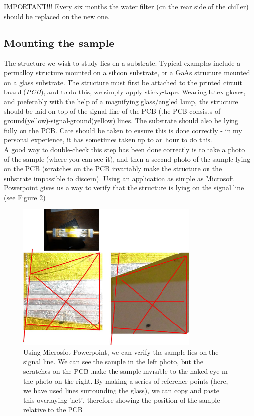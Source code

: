 \documentclass[14pt,a4paper] {article}
\begin{document}
IMPORTANT!!! Every six months the water filter (on the rear side of the chiller) should be replaced on the new one.

\subsection{Mounting the sample}

The structure we wish to study lies on a substrate. Typical examples include a permalloy structure mounted on a silicon substrate, or a GaAs structure mounted on a glass substrate. The structure must first be attached to the printed circuit board ({\it PCB}), and to do this, we simply apply sticky-tape. Wearing latex gloves, and preferably with the help of a magnifying glass/angled lamp, the structure should be laid on top of the signal line of the PCB (the PCB consists of ground(yellow)-signal-ground(yellow) lines. The substrate should also be lying fully on the PCB. Care should be taken to ensure this is done correctly - in my personal experience, it has sometimes taken up to an hour to do this.
\\

A good way to double-check this step has been done correctly is to take a photo of the sample (where you can see it), and then a second photo of the sample lying on the PCB (scratches on the PCB invariably make the structure on the substrate impossible to discern). Using an application as simple as Microsoft Powerpoint gives us a way to verify that the structure is lying on the signal line (see Figure 2) 

\begin{figure}
\includegraphics[width=0.8\textwidth]{PCB-Signal-line-Sample-Verification.jpg}

\caption{Using Microsfot Powerpoint, we can verify the sample lies on the signal line. We can see the sample in the left photo, but the scratches on the PCB make the sample invisible to the naked eye in the photo on the right. By making a series of reference points (here, we have used lines surrounding the glass), we can copy and paste this overlaying 'net', therefore showing the position of the sample relative to the PCB}
\label{overflow}
\end{figure}
\end{document}
